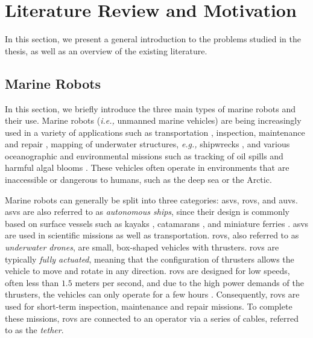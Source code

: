 \section{Literature Review and Motivation}
\label{sec:introduction_literature}

In this section, we present a general introduction to the problems studied in the thesis, as well as an overview of the existing literature.

\subsection{Marine Robots}

In this section, we briefly introduce the three main types of marine robots and their use.
Marine robots (\emph{i.e.,} unmanned marine vehicles) are being increasingly used in a variety of applications such as transportation \cite{pi_transportation_2021,brekke_milliampere_2022}, inspection, maintenance and repair \cite{palomer_inspection_2019,mcleod_inspection_repair_maintenance_2010}, mapping of underwater structures, \emph{e.g.,} shipwrecks \cite{bingham_shipwreck_2010}, and various oceanographic and environmental missions such as tracking of oil spills \cite{petillo_plume_tracking_2012} and harmful algal blooms \cite{robbins_harmful_algae_2006}.
These vehicles often operate in environments that are inaccessible or dangerous to humans, such as the deep sea or the Arctic.

Marine robots can generally be split into three categories: \glspl{asv}, \glspl{rov}, and \glspl{auv}.
\Glspl{asv} are also referred to as \emph{autonomous ships}, since their design is commonly based on surface vessels such as kayaks \cite{kimball_jetkayak_2014}, catamarans \cite{choi_asv_2020,zolich_catamaran_2022}, and miniature ferries \cite{brekke_milliampere_2022}. \Glspl{asv} are used in scientific missions as well as transportation.
\Glspl{rov}, also referred to as \emph{underwater drones}, are small, box-shaped vehicles with thrusters.
\Glspl{rov} are typically \emph{fully actuated}, meaning that the configuration of thrusters allows the vehicle to move and rotate in any direction.
\Glspl{rov} are designed for low speeds, often less than $1.5$ meters per second, and due to the high power demands of the thrusters, the vehicles can only operate for a few hours \cite{bluerov2}.
Consequently, \glspl{rov} are used for short-term inspection, maintenance and repair missions.
To complete these missions, \glspl{rov} are connected to an operator via a series of cables, referred to as the \emph{tether}.


